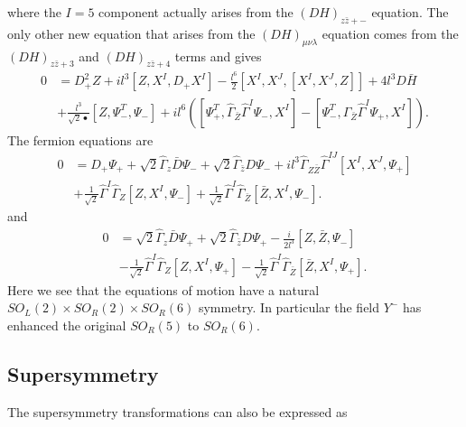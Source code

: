\documentclass[12pt]{article}
\numberwithin{equation}{section}
\begin{document}
where the $I=5$ component actually arises from the $(DH)_{z\bar z +-}$ equation. 
The only other new equation that arises from the $(DH)_{\mu\nu\lambda}$ equation comes from the  $(DH)_{z\bar z +3}$ and $(DH)_{z\bar z +4}$ terms and gives 
\begin{align}\label{F1}
0 &= D_+^2Z+ il^3[Z, X^I, D_+X^I] - \frac{l^6}{2}[X^I,X^J,[X^I,X^J,Z]] +4l^3 D \bar{H}\nonumber \\ & + \frac{l^3}{\sqrt{2}•} \left[ Z, \Psi_-^T , \Psi_- \right]  + i l^6 \left( \left[ \Psi_+^T, \hat{\Gamma}_{\bar{Z}} \hat{\Gamma}^I \Psi_-, X^I \right] - \left[ \Psi_-^T, \hat{\Gamma}_{\bar{Z}} \hat{\Gamma}^I \Psi_+, X^I \right]  \right) .
\end{align}
The fermion equations are
 \begin{align}
 0 & = D_+\Psi_+ + \sqrt{2}\hat{\Gamma}_z \bar{D} \Psi_- + \sqrt{2}\hat{\Gamma}_{\bar{z}} D \Psi_- + i l^3 \hat{\Gamma}_{Z \bar{Z}} \hat{\Gamma}^{IJ} \left[ X^I, X^J, \Psi_+ \right] \nonumber \\ & + \frac{1}{\sqrt{2}} \hat{\Gamma}^I \hat{\Gamma}_Z \left[ Z, X^I, \Psi_- \right] + \frac{1}{\sqrt{2}} \hat{\Gamma}^I \hat{\Gamma}_{\bar{Z}} \left[ \bar{Z}, X^I, \Psi_- \right]    .
 \end{align}
 and 
\begin{align}
0 &= \sqrt{2} \hat{\Gamma}_z \bar{D} \Psi_+ + \sqrt{2} \hat{\Gamma}_{\bar{z}} D \Psi_+ - \frac{i}{2l^3} \left[ Z, \bar{Z}, \Psi_- \right] \nonumber \\ & - \frac{1}{\sqrt{2}} \hat{\Gamma}^I \hat{\Gamma}_Z \left[ Z, X^I, \Psi_+ \right] - \frac{1}{\sqrt{2}} \hat{\Gamma}^I \hat{\Gamma}_{\bar{Z}} \left[ \bar{Z} , X^I, \Psi_+ \right]    .
\end{align}
Here we see that the equations of motion have a natural $SO_L(2)\times SO_R(2)\times SO_R(6)$ symmetry. In particular the field $Y^-$ has enhanced the original $SO_R(5)$ to $SO_R(6)$. 

\subsection{Supersymmetry}

The supersymmetry transformations can also be expressed as
\end{document}
